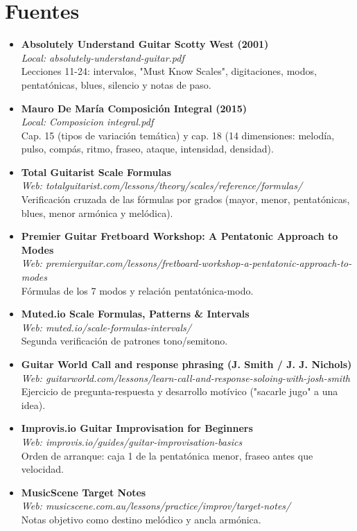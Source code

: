 \documentclass[11pt,a4paper]{article}
\begin{document}
\section{Fuentes}
\begin{itemize}
\item \textbf{Absolutely Understand Guitar \textemdash{} Scotty West (2001)} \\ \emph{Local: absolutely-understand-guitar.pdf} \\ Lecciones 11-24: intervalos, "Must Know Scales", digitaciones, modos, pentatónicas, blues, silencio y notas de paso.
\item \textbf{Mauro De María \textemdash{} Composición Integral (2015)} \\ \emph{Local: Composicion integral.pdf} \\ Cap. 15 (tipos de variación temática) y cap. 18 (14 dimensiones: melodía, pulso, compás, ritmo, fraseo, ataque, intensidad, densidad).
\item \textbf{Total Guitarist \textemdash{} Scale Formulas} \\ \emph{Web: totalguitarist.com/lessons/theory/scales/reference/formulas/} \\ Verificación cruzada de las fórmulas por grados (mayor, menor, pentatónicas, blues, menor armónica y melódica).
\item \textbf{Premier Guitar \textemdash{} Fretboard Workshop: A Pentatonic Approach to Modes} \\ \emph{Web: premierguitar.com/lessons/fretboard-workshop-a-pentatonic-approach-to-modes} \\ Fórmulas de los 7 modos y relación pentatónica-modo.
\item \textbf{Muted.io \textemdash{} Scale Formulas, Patterns \& Intervals} \\ \emph{Web: muted.io/scale-formulas-intervals/} \\ Segunda verificación de patrones tono/semitono.
\item \textbf{Guitar World \textemdash{} Call and response phrasing (J. Smith / J. J. Nichols)} \\ \emph{Web: guitarworld.com/lessons/learn-call-and-response-soloing-with-josh-smith} \\ Ejercicio de pregunta-respuesta y desarrollo motívico ("sacarle jugo" a una idea).
\item \textbf{Improvis.io \textemdash{} Guitar Improvisation for Beginners} \\ \emph{Web: improvis.io/guides/guitar-improvisation-basics} \\ Orden de arranque: caja 1 de la pentatónica menor, fraseo antes que velocidad.
\item \textbf{MusicScene \textemdash{} Target Notes} \\ \emph{Web: musicscene.com.au/lessons/practice/improv/target-notes/} \\ Notas objetivo como destino melódico y ancla armónica.
\end{itemize}
\end{document}
